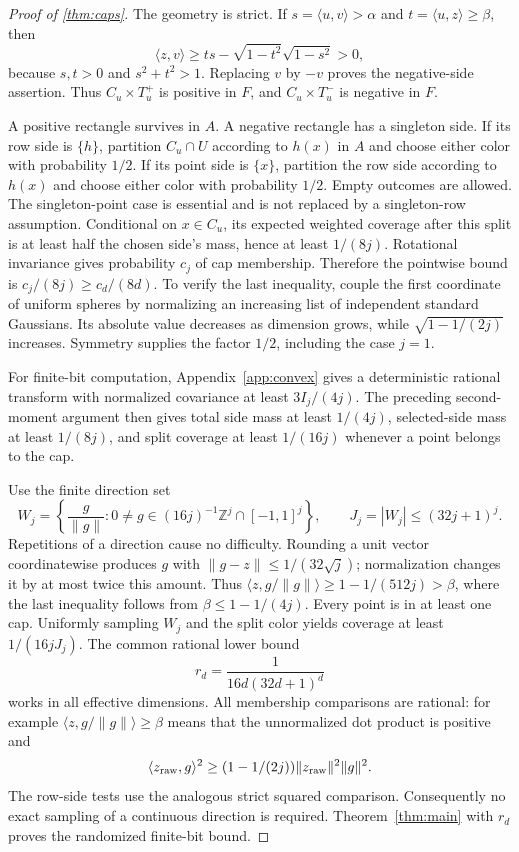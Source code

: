 \begin{proof}[Proof of \cref{thm:caps}]
The geometry is strict. If $s=\langle u,v\rangle>\alpha$ and $t=\langle u,z\rangle\ge\beta$, then
\[
 \langle z,v\rangle\ge ts-\sqrt{1-t^2}\sqrt{1-s^2}>0,
\]
because $s,t>0$ and $s^2+t^2>1$. Replacing $v$ by $-v$ proves the negative-side assertion. Thus $C_u\times T_u^+$ is positive in $F$, and $C_u\times T_u^-$ is negative in $F$.

A positive rectangle survives in $A$. A negative rectangle has a singleton side. If its row side is $\{h\}$, partition $C_u\cap U$ according to $h(x)$ in $A$ and choose either color with probability $1/2$. If its point side is $\{x\}$, partition the row side according to $h(x)$ and choose either color with probability $1/2$. Empty outcomes are allowed. The singleton-point case is essential and is not replaced by a singleton-row assumption. Conditional on $x\in C_u$, its expected weighted coverage after this split is at least half the chosen side's mass, hence at least $1/(8j)$. Rotational invariance gives probability $c_j$ of cap membership. Therefore the pointwise bound is $c_j/(8j)\ge c_d/(8d)$. To verify the last inequality, couple the first coordinate of uniform spheres by normalizing an increasing list of independent standard Gaussians. Its absolute value decreases as dimension grows, while $\sqrt{1-1/(2j)}$ increases. Symmetry supplies the factor $1/2$, including the case $j=1$.

For finite-bit computation, Appendix~\ref{app:convex} gives a deterministic rational transform with normalized covariance at least $3I_j/(4j)$. The preceding second-moment argument then gives total side mass at least $1/(4j)$, selected-side mass at least $1/(8j)$, and split coverage at least $1/(16j)$ whenever a point belongs to the cap.

Use the finite direction set
\[
 W_j=\left\{\frac{g}{\|g\|}:0\ne g\in(16j)^{-1}\mathbb Z^j\cap[-1,1]^j\right\},
 \qquad J_j=|W_j|\le(32j+1)^j.
\]
Repetitions of a direction cause no difficulty. Rounding a unit vector coordinatewise produces $g$ with $\|g-z\|\le1/(32\sqrt j)$; normalization changes it by at most twice this amount. Thus $\langle z,g/\|g\|\rangle\ge1-1/(512j)>\beta$, where the last inequality follows from $\beta\le1-1/(4j)$. Every point is in at least one cap. Uniformly sampling $W_j$ and the split color yields coverage at least $1/(16jJ_j)$. The common rational lower bound
\begin{equation}\label{eq:netr}
 r_d=\frac1{16d(32d+1)^d}
\end{equation}
works in all effective dimensions. All membership comparisons are rational: for example $\langle z,g/\|g\|\rangle\ge\beta$ means that the unnormalized dot product is positive and
\[
 \langle z_{\rm raw},g\rangle^2\ge(1-1/(2j))\|z_{\rm raw}\|^2\|g\|^2.
\] The row-side tests use the analogous strict squared comparison. Consequently no exact sampling of a continuous direction is required. Theorem~\ref{thm:main} with $r_d$ proves the randomized finite-bit bound.


\end{proof}
